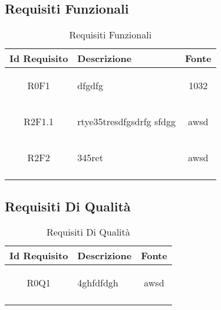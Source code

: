 \subsection{Requisiti Funzionali}
\normalsize
\begin{longtable}{|c|H|c|}
\hline
\textbf{Id Requisito} & \textbf{Descrizione} & \textbf{Fonte}\\
\hline
\endhead
\hypertarget{R0F1}{R0F1} & dfgdfg & 1032 \\ \hline 
\hypertarget{R2F1.1}{R2F1.1} & rtye35tresdfgsdrfg sfdgg  & awsd \\ \hline 
\hypertarget{R2F2}{R2F2} & 345ret & awsd \\ \hline 
\caption[Requisiti Funzionali]{Requisiti Funzionali}
\label{tabella:req0}
\end{longtable}
\clearpage
{}
\subsection{Requisiti Di Qualità}
\normalsize
\begin{longtable}{|c|H|c|}
\hline
\textbf{Id Requisito} & \textbf{Descrizione} & \textbf{Fonte}\\
\hline
\endhead
\hypertarget{R0Q1}{R0Q1} & 4ghfdfdgh & awsd \\ \hline 
\caption[Requisiti Di Qualità]{Requisiti Di Qualità}
\label{tabella:req1}
\end{longtable}
\clearpage
